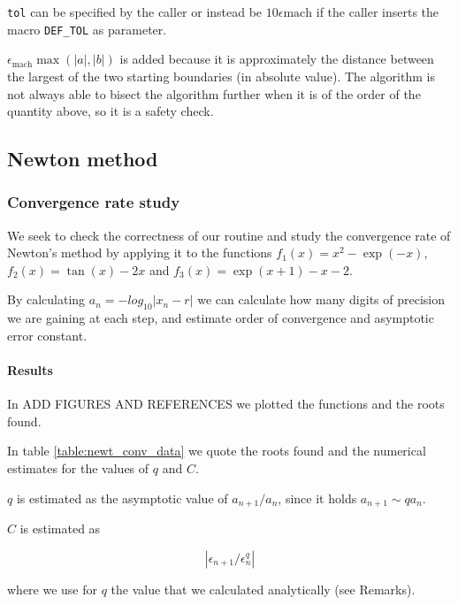 \documentclass[a4paper,11]{article}
\newcommand{\mdcode}[1]{\lstinline[backgroundcolor=\color{gray!10}, frame=single, frameround=tttt]|#1|}
\begin{document}
\mdcode{tol} can be specified by the caller or instead be 
$10\epsilon{\text{mach}}$ if the caller inserts the macro \mdcode{DEF_TOL}
as parameter.

$\epsilon_{\text{mach}}\max(|a|,|b|)$ is added because it is approximately the
distance between the largest of the two starting boundaries (in absolute value).
The algorithm is not always able to bisect the algorithm further when it is of 
the order of the quantity above, so it is a safety check.



\subsection{Newton method}


\subsubsection{Convergence rate study}\label{sssec:text_newt}

We seek to check the correctness of our routine and study the convergence 
rate of Newton's method by applying it to the functions 
$f_{1}(x)=x^{2} - \exp(-x)$,
$f_{2}(x) = \tan(x) - 2x$ and $f_{3}(x) = \exp(x + 1) - x - 2$.

By calculating $a_{n} = -log_{10}|x_{n} - r|$ we can calculate how many digits 
of precision
we are gaining at each step, and estimate order of convergence and asymptotic
error constant.



\paragraph{Results}

In ADD FIGURES AND REFERENCES we plotted the functions and the roots found.

In table \ref{table:newt_conv_data} we quote the roots found and the numerical 
estimates for the values of $q$ and $C$.

$q$ is estimated as the asymptotic value of $a_{n+1}/a_{n}$, since it holds
$a_{n+1} \sim q a_{n}$.

$C$ is estimated as 

\[
	\left| \epsilon_{n+1} / \epsilon_{n}^{q} \right|
\]

where we use for $q$ the value that we calculated analytically (see Remarks).
\end{document}
